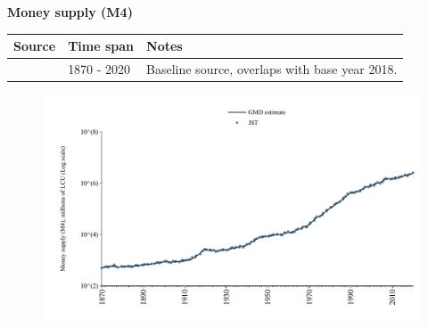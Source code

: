 \documentclass[12pt,a4paper,landscape]{article}
\begin{document}
\begin{adjustbox}{max totalsize={\paperwidth}{\paperheight},center}
\begin{minipage}[t][\textheight][t]{\textwidth}
\vspace*{0.5cm}
{}
\begin{center}
{\Large\bfseries Money supply (M4)}
\end{center}
\vspace{0.5cm}
\begin{table}[H]
\centering
\small
\begin{tabular}{|l|l|l|}
\hline
\textbf{Source} & \textbf{Time span} & \textbf{Notes} \\
\hline
\rowcolor{white}\cite{JST}& 1870 - 2020 &Baseline source, overlaps with base year 2018. \\
\hline
\end{tabular}
\end{table}
\begin{figure}[H]
\centering
\includegraphics[width=\textwidth,height=0.6\textheight,keepaspectratio]{graphs/GBR_M4.pdf}
\end{figure}
\end{minipage}
\end{adjustbox}
\end{document}
